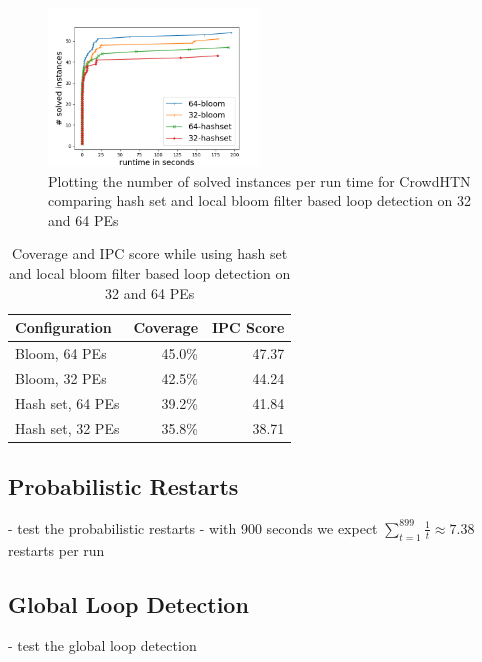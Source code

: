 \begin{figure}
	\caption{Plotting the number of solved instances per run time for CrowdHTN comparing hash set and local bloom filter based loop detection on 32 and 64 PEs}
	\label{figure: eval loop detection}
	\centering
	\includegraphics[width=0.5\textwidth]{images/final/loop_detection}
\end{figure}

\begin{table}
	\caption{Coverage and IPC score while using hash set and local bloom filter based loop detection on 32 and 64 PEs}
	\label{table: eval loop detection}
	\centering
	\begin{tabular}{| l | r | r |}
		\hline
		Configuration & Coverage & IPC Score \\
		\hline
		Bloom, 64 PEs		& 45.0\%	& 47.37 \\ %
		Bloom, 32 PEs		& 42.5\%	& 44.24 \\ %
		Hash set, 64 PEs	& 39.2\%	& 41.84 \\ %
		Hash set, 32 PEs	& 35.8\%	& 38.71 \\ %
		\hline
	\end{tabular}
\end{table}

\subsection{Probabilistic Restarts}
\label{eval: restarts}
- test the probabilistic restarts
- with 900 seconds we expect $\sum_{t=1}^{899} \frac{1}{t} \approx 7.38$ restarts per run


\subsection{Global Loop Detection}
\label{eval: global loop}
- test the global loop detection


